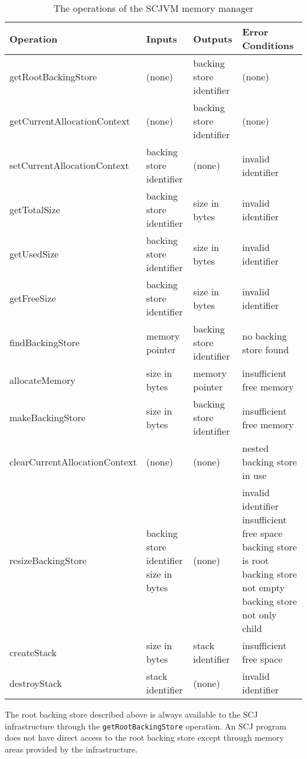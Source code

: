 \documentclass[a4paper,10pt]{report}
\begin{document}
\begin{table}[ht]
  \centering
  \footnotesize
  \begin{tabular}{|l|p{3cm}|p{3cm}|p{3.6cm}|}
    Operation & Inputs & Outputs & Error Conditions \\
    \hline
    getRootBackingStore &
    (none) &
    backing store identifier &
    (none)
    \\getCurrentAllocationContext &
    (none) &
    backing store identifier &
    (none)
    \\setCurrentAllocationContext &
    backing store identifier &
    (none) &
    invalid identifier
    \\getTotalSize &
    backing store identifier &
    size in bytes &
    invalid identifier
    \\getUsedSize &
    backing store identifier &
    size in bytes &
    invalid identifier
    \\getFreeSize &
    backing store identifier &
    size in bytes &
    invalid identifier
    \\findBackingStore &
    memory pointer &
    backing store identifier &
    no backing store found
    \\allocateMemory &
    size in bytes &
    memory pointer &
    insufficient free memory
    \\makeBackingStore &
    size in bytes & 
    backing store identifier &
    insufficient free memory
    \\clearCurrentAllocationContext &
    (none) &
    (none) &
    nested backing store in use
    \\resizeBackingStore &
    backing store identifier \newline
    size in bytes &
    (none) &
    invalid identifier \newline
    insufficient free space \newline
    backing store is root \newline
    backing store not empty \newline
    backing store not only child
    \\createStack &
    size in bytes &
    stack identifier &
    insufficient free space
    \\destroyStack &
    stack identifier &
    (none) &
    invalid identifier
  \end{tabular}
  \caption{The operations of the SCJVM memory manager}
  \label{memory-manager-table}
\end{table}

The root backing store described above is always available to the SCJ
infrastructure through the \texttt{get\-Root\-Backing\-Store}
operation.
An SCJ program does not have direct access to the root backing store
except through memory areas provided by the infrastructure.
\end{document}
